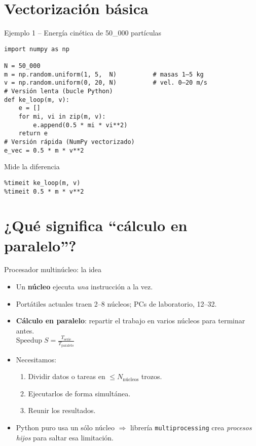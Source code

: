 \documentclass[10pt]{beamer}
\begin{document}
\section{Vectorización básica}
\begin{frame}[fragile]{Ejemplo 1 -- Energía cinética de 50\_000 partículas}
\begin{verbatim}
import numpy as np

N = 50_000
m = np.random.uniform(1, 5,  N)          # masas 1–5 kg
v = np.random.uniform(0, 20, N)          # vel. 0–20 m/s
# Versión lenta (bucle Python)
def ke_loop(m, v):
    e = []
    for mi, vi in zip(m, v):
        e.append(0.5 * mi * vi**2)
    return e
# Versión rápida (NumPy vectorizado)
e_vec = 0.5 * m * v**2
\end{verbatim}

\begin{block}{\small Mide la diferencia}
\begin{verbatim}
%timeit ke_loop(m, v)
%timeit 0.5 * m * v**2
\end{verbatim}
\end{block}
\end{frame}

% 

\section{¿Qué significa “cálculo en paralelo”?}

\begin{frame}{Procesador multinúcleo: la idea}
\begin{itemize}
  \item Un \textbf{núcleo} ejecuta \emph{una} instrucción a la vez.
  \item Portátiles actuales traen 2–8 núcleos; PCs de laboratorio, 12–32.
  \item \textbf{Cálculo en paralelo}: repartir el trabajo en varios núcleos para
        terminar antes. \\
        \(\displaystyle \text{Speedup}\;S = \frac{T_{\text{serie}}}{T_{\text{paralelo}}}\)
  \item Necesitamos:  
        \begin{enumerate}
          \item Dividir datos o tareas en \(\le N_{\text{núcleos}}\) trozos.  
          \item Ejecutarlos de forma simultánea.  
          \item Reunir los resultados.  
        \end{enumerate}
  \item Python puro usa un sólo núcleo \(\Rightarrow\) librería
        \texttt{multiprocessing} crea \emph{procesos hijos} para saltar esa
        limitación.
\end{itemize}
\end{frame}
\end{document}
